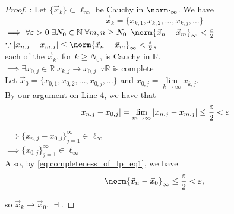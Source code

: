 \documentclass[notoc,notitlepage]{tufte-book}
\begin{document}
\begin{proof}
  : Let $\{ \vec{x}_k \} \subset \ell_\infty$ be Cauchy in $\norm\cdot_\infty$. We have
  \begin{equation*}
    \vec{x}_k = \{ x_{k, 1}, x_{k, 2}, \ldots, x_{k, j}, \ldots \}
  \end{equation*}
  $\implies \forall \epsilon > 0 \; \exists N_0 \in \mathbb{N} \; \forall m, n \geq N_0 \enspace \norm{\vec{x}_n - \vec{x}_m}_\infty < \frac{\epsilon}{2}$ \\
  $\because \abs{ x_{n, j} - x_{m, j} } \leq \norm{\vec{x}_n - \vec{x}_m}_\infty < \frac{\epsilon}{2}$,\\
  each of the $\vec{x}_k$, for $k \geq N_0$, is Cauchy in $\mathbb{R}$. \\
  $\implies \exists x_{0, j} \in \mathbb{R} \; x_{k, j} \to x_{0, j} \enspace \because \mathbb{R}$ is complete \\
  Let $\vec{x}_0 = \{ x_{0, 1}, x_{0, 2}, \ldots, x_{0, j}, \ldots \}$ and $x_{0, j} = \lim\limits_{k \to \infty} x_{k, j}$. \\ By our argument on Line 4, we have that
  \begin{equation}\label{eq:completeness_of_lp_eq1}
    \left|x_{n, j} - x_{0, j}\right| = \lim_{m \to \infty} \left| x_{n, j} - x_{m, j} \right| \leq \frac{\varepsilon}{2} < \varepsilon
  \end{equation}

  $\implies \{ x_{n, j} - x_{0, j} \}_{j = 1}^{\infty} \in \ell_\infty$ \\
  $\implies \{ x_{0, j} \}_{j = 1}^{\infty} \in \ell_\infty$ \\
  Also, by \cref{eq:completeness_of_lp_eq1}, we have
  \begin{equation*}
    \norm{\vec{x}_n - \vec{x}_0}_\infty \leq \frac{\epsilon}{2} < \epsilon,
  \end{equation*}

  so $\vec{x}_k \to \vec{x}_0$. $\dashv$.


\end{proof}
\end{document}
